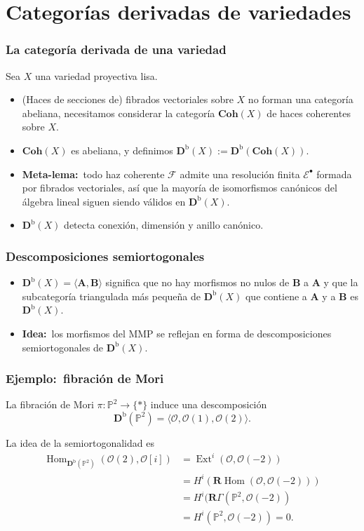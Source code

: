 \documentclass[12pt]{beamer}
\begin{document}
\section{Categorías derivadas de variedades}

\begin{frame}
  \frametitle{La categoría derivada de una variedad}
  Sea $X$ una variedad proyectiva lisa.
  \begin{itemize}
    \item (Haces de secciones de) fibrados vectoriales sobre $X$ no forman una categoría abeliana, necesitamos considerar la categoría $\mathbf{Coh}(X)$ de haces coherentes sobre $X$.
      \pause
    \item $\mathbf{Coh}(X)$ es abeliana, y definimos $\mathbf{D}^{\mathrm{b}}(X) := \mathbf{D}^{\mathrm{b}}(\mathbf{Coh}(X))$.
      \pause
    \item \textbf{Meta-lema:}~todo haz coherente $\mathscr{F}$ admite una resolución finita $\mathscr{E}^{\bullet}$ formada por fibrados vectoriales, así que la mayoría de isomorfismos canónicos del álgebra lineal siguen siendo válidos en $\mathbf{D}^{\mathrm{b}}(X)$.
      \pause
    \item $\mathbf{D}^{\mathrm{b}}(X)$ detecta conexión, dimensión y anillo canónico.
  \end{itemize}
\end{frame}

\begin{frame}
  \frametitle{Descomposiciones semiortogonales}
  \begin{itemize}
    \item $\mathbf{D}^{\mathrm{b}}(X) = \langle \mathbf{A}, \mathbf{B} \rangle$ significa que no hay morfismos no nulos de $\mathbf{B}$ a $\mathbf{A}$ y que la subcategoría triangulada más pequeña de $\mathbf{D}^{\mathrm{b}}(X)$ que contiene a $\mathbf{A}$ y a $\mathbf{B}$ es $\mathbf{D}^{\mathrm{b}}(X)$.
      \pause
    \item \textbf{Idea:}~los morfismos del MMP se reflejan en forma de descomposiciones semiortogonales de $\mathbf{D}^{\mathrm{b}}(X)$.
  \end{itemize}
\end{frame}

\begin{frame}
  \frametitle{Ejemplo:~fibración de Mori}
  La fibración de Mori $\pi \colon \mathbb{P}^{2} \to \{ * \}$ induce una descomposición
  \[ \mathbf{D}^{\mathrm{b}}(\mathbb{P}^{2}) = \langle \mathscr{O}, \mathscr{O}(1), \mathscr{O}(2) \rangle. \]
  \pause

  La idea de la semiortogonalidad es
  \begin{align*}
    \operatorname{Hom}_{\mathbf{D}^{\mathrm{b}}(\mathbb{P}^{2})}(\mathscr{O}(2),\mathscr{O}[i]) & = \operatorname{Ext}^{i}(\mathscr{O},\mathscr{O}(-2)) \\
    & = H^{i}(\mathbf{R}\operatorname{Hom}(\mathscr{O},\mathscr{O}(-2))) \\
    & = H^{i}(\mathbf{R}\Gamma(\mathbb{P}^{2},\mathscr{O}(-2)) \\
    & = H^{i}(\mathbb{P}^{2},\mathscr{O}(-2)) = 0.
  \end{align*}
\end{frame}
\end{document}
